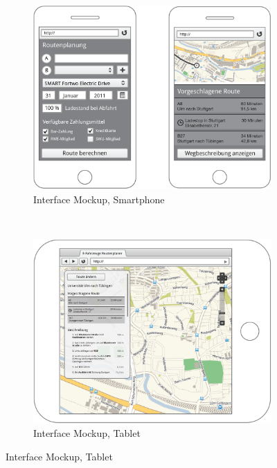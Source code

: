 \documentclass{proposal}
\begin{document}
\begin{figure}[h]
        \centering
        \begin{subfigure}[b]{0.5\textwidth}
                \centering
	  \includegraphics[scale=0.14]{images/phones}
                \caption{Interface Mockup, Smartphone}
                \label{fig:gull}
        \end{subfigure}%
        ~ 
        \begin{subfigure}[b]{0.5\textwidth}
                \centering
                \includegraphics[scale=0.14]{images/tablet}
                \caption{Interface Mockup, Tablet}
                \label{fig:tiger}
        \end{subfigure}
\end{figure}
\end{document}
